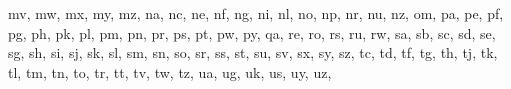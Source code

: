 \documentclass[letterpaper,10pt,english]{sphinxmanual}
\begin{document}
\begin{fulllineitems}
\begin{fulllineitems}
\textquotesingle{}mv\textquotesingle{}, \textquotesingle{}mw\textquotesingle{}, \textquotesingle{}mx\textquotesingle{}, \textquotesingle{}my\textquotesingle{}, \textquotesingle{}mz\textquotesingle{}, \textquotesingle{}na\textquotesingle{}, \textquotesingle{}nc\textquotesingle{}, \textquotesingle{}ne\textquotesingle{}, \textquotesingle{}nf\textquotesingle{}, \textquotesingle{}ng\textquotesingle{}, \textquotesingle{}ni\textquotesingle{}, \textquotesingle{}nl\textquotesingle{}, \textquotesingle{}no\textquotesingle{}, \textquotesingle{}np\textquotesingle{}, \textquotesingle{}nr\textquotesingle{}, \textquotesingle{}nu\textquotesingle{}, \textquotesingle{}nz\textquotesingle{}, \textquotesingle{}om\textquotesingle{}, \textquotesingle{}pa\textquotesingle{}, \textquotesingle{}pe\textquotesingle{}, \textquotesingle{}pf\textquotesingle{}, \textquotesingle{}pg\textquotesingle{}, \textquotesingle{}ph\textquotesingle{}, \textquotesingle{}pk\textquotesingle{}, \textquotesingle{}pl\textquotesingle{}, \textquotesingle{}pm\textquotesingle{}, \textquotesingle{}pn\textquotesingle{}, \textquotesingle{}pr\textquotesingle{}, \textquotesingle{}ps\textquotesingle{}, \textquotesingle{}pt\textquotesingle{}, \textquotesingle{}pw\textquotesingle{}, \textquotesingle{}py\textquotesingle{}, \textquotesingle{}qa\textquotesingle{}, \textquotesingle{}re\textquotesingle{}, \textquotesingle{}ro\textquotesingle{}, \textquotesingle{}rs\textquotesingle{}, \textquotesingle{}ru\textquotesingle{}, \textquotesingle{}rw\textquotesingle{}, \textquotesingle{}sa\textquotesingle{}, \textquotesingle{}sb\textquotesingle{}, \textquotesingle{}sc\textquotesingle{}, \textquotesingle{}sd\textquotesingle{}, \textquotesingle{}se\textquotesingle{}, \textquotesingle{}sg\textquotesingle{}, \textquotesingle{}sh\textquotesingle{}, \textquotesingle{}si\textquotesingle{}, \textquotesingle{}sj\textquotesingle{}, \textquotesingle{}sk\textquotesingle{}, \textquotesingle{}sl\textquotesingle{}, \textquotesingle{}sm\textquotesingle{}, \textquotesingle{}sn\textquotesingle{}, \textquotesingle{}so\textquotesingle{}, \textquotesingle{}sr\textquotesingle{}, \textquotesingle{}ss\textquotesingle{}, \textquotesingle{}st\textquotesingle{}, \textquotesingle{}su\textquotesingle{}, \textquotesingle{}sv\textquotesingle{}, \textquotesingle{}sx\textquotesingle{}, \textquotesingle{}sy\textquotesingle{}, \textquotesingle{}sz\textquotesingle{}, \textquotesingle{}tc\textquotesingle{}, \textquotesingle{}td\textquotesingle{}, \textquotesingle{}tf\textquotesingle{}, \textquotesingle{}tg\textquotesingle{}, \textquotesingle{}th\textquotesingle{}, \textquotesingle{}tj\textquotesingle{}, \textquotesingle{}tk\textquotesingle{}, \textquotesingle{}tl\textquotesingle{}, \textquotesingle{}tm\textquotesingle{}, \textquotesingle{}tn\textquotesingle{}, \textquotesingle{}to\textquotesingle{}, \textquotesingle{}tr\textquotesingle{}, \textquotesingle{}tt\textquotesingle{}, \textquotesingle{}tv\textquotesingle{}, \textquotesingle{}tw\textquotesingle{}, \textquotesingle{}tz\textquotesingle{}, \textquotesingle{}ua\textquotesingle{}, \textquotesingle{}ug\textquotesingle{}, \textquotesingle{}uk\textquotesingle{}, \textquotesingle{}us\textquotesingle{}, \textquotesingle{}uy\textquotesingle{}, \textquotesingle{}uz\textquotesingle{}, 
\end{fulllineitems}
\end{fulllineitems}
\end{document}
